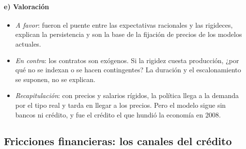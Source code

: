 \documentclass[11pt]{article}
\begin{document}
\paragraph{e) Valoración}
\begin{itemize}
\item \emph{A favor}: fueron el puente entre las expectativas racionales y las rigideces, explican la persistencia y son la base de la fijación de precios de los modelos actuales.
\item \emph{En contra}: los contratos son exógenos. Si la rigidez cuesta producción, ¿por qué no se indexan o se hacen contingentes\nocite{Barro1977Long}? La duración y el escalonamiento se suponen, no se explican.
\item \emph{Recapitulación}: con precios y salarios rígidos, la política llega a la demanda por el tipo real y tarda en llegar a los precios. Pero el modelo sigue sin bancos ni crédito, y fue el crédito el que hundió la economía en 2008.
\end{itemize}

\subsection{Fricciones financieras: los canales del crédito}\label{sec:fricciones}
\end{document}
